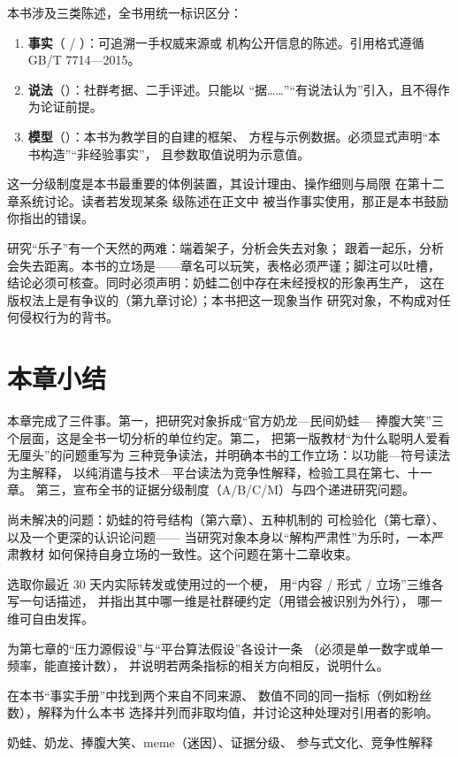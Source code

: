 本书涉及三类陈述，全书用统一标识区分：

\begin{enumerate}[label=\arabic*.]
  \item \textbf{事实}（ / ）：可追溯一手权威来源或
        机构公开信息的陈述。引用格式遵循 GB/T 7714—2015\cite{gbt7714_2015}。
  \item \textbf{说法}（）：社群考据、二手评述。只能以
        “据……”“有说法认为”引入，且不得作为论证前提。
  \item \textbf{模型}（）：本书为教学目的自建的框架、
        方程与示例数据。必须显式声明“本书构造”“非经验事实”，
        且参数取值说明为示意值。
\end{enumerate}

这一分级制度是本书最重要的体例装置，其设计理由、操作细则与局限
在第十二章系统讨论。读者若发现某条  级陈述在正文中
被当作事实使用，那正是本书鼓励你指出的错误。

\begin{nlcritique}[批判性反思]
  研究“乐子”有一个天然的两难：端着架子，分析会失去对象；
  跟着一起乐，分析会失去距离。本书的立场是——章名可以玩笑，表格必须严谨；脚注可以吐槽，
  结论必须可核查。同时必须声明：奶蛙二创中存在未经授权的形象再生产，
  这在版权法上是有争议的（第九章讨论）；本书把这一现象当作
  研究对象，不构成对任何侵权行为的背书。
\end{nlcritique}

\section{本章小结}\label{sec:01:summary}

本章完成了三件事。第一，把研究对象拆成“官方奶龙—民间奶蛙—
捧腹大笑”三个层面，这是全书一切分析的单位约定。第二，
把第一版教材“为什么聪明人爱看无厘头”的问题重写为
三种竞争读法，并明确本书的工作立场：以功能—符号读法为主解释，
以纯消遣与技术—平台读法为竞争性解释，检验工具在第七、十一章。
第三，宣布全书的证据分级制度（A/B/C/M）与四个递进研究问题。

尚未解决的问题：奶蛙的符号结构（第六章）、五种机制的
可检验化（第七章）、以及一个更深的认识论问题——
当研究对象本身以“解构严肃性”为乐时，一本严肃教材
如何保持自身立场的一致性。这个问题在第十二章收束。

\begin{nlexercises}
  \item 选取你最近 30 天内实际转发或使用过的一个梗，
        用“内容 / 形式 / 立场”三维各写一句话描述，
        并指出其中哪一维是社群硬约定（用错会被识别为外行），
        哪一维可自由发挥。
  \item 为第七章的“压力源假设”与“平台算法假设”各设计一条
        （必须是单一数字或单一频率，能直接计数），
        并说明若两条指标的相关方向相反，说明什么。
  \item 在本书“事实手册”中找到两个来自不同来源、
        数值不同的同一指标（例如粉丝数），解释为什么本书
        选择并列而非取均值，并讨论这种处理对引用者的影响。
\end{nlexercises}

\nlkeywords 奶蛙、奶龙、捧腹大笑、meme（迷因）、证据分级、
参与式文化、竞争性解释
